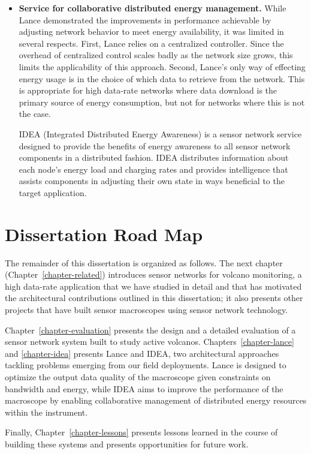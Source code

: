 \begin{itemize}
\item \textbf{Service for collaborative distributed energy management.} While
Lance demonstrated the improvements in performance achievable by adjusting
network behavior to meet energy availability, it was limited in several
respects. First, Lance relies on a centralized controller. Since the overhead
of centralized control scales badly as the network size grows, this limits
the applicability of this approach. Second, Lance's only way of effecting
energy usage is in the choice of which data to retrieve from the network. This
is appropriate for high data-rate networks where data download is the primary
source of energy consumption, but not for networks where this is not the
case.

IDEA (Integrated Distributed Energy Awareness) is a sensor network service
designed to provide the benefits of energy awareness to all sensor network
components in a distributed fashion. IDEA distributes information about each
node's energy load and charging rates and provides intelligence that assists
components in adjusting their own state in ways beneficial to the target
application.

\end{itemize}

\section{Dissertation Road Map}

The remainder of this dissertation is organized as follows. The next chapter
(Chapter~\ref{chapter-related}) introduces sensor networks for volcano
monitoring, a high data-rate application that we have studied in detail and
that has motivated the architectural contributions outlined in this
dissertation; it also presents other projects that have built sensor
macroscopes using sensor network technology.

Chapter~\ref{chapter-evaluation} presents the design and a detailed
evaluation of a sensor network system built to study active volcanos.
Chapters~\ref{chapter-lance} and \ref{chapter-idea} presents Lance and IDEA,
two architectural approaches tackling problems emerging from our field
deployments. Lance is designed to optimize the output data quality of the
macroscope given constraints on bandwidth and energy, while IDEA aims to
improve the performance of the macroscope by enabling collaborative
management of distributed energy resources within the instrument.

Finally, Chapter~\ref{chapter-lessons} presents lessons learned in the course
of building these systems and presents opportunities for future work.
